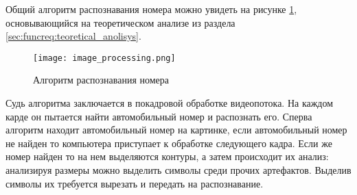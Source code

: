 Общий алгоритм распознавания номера можно увидеть на рисунке \ref{fig:arch:algorythm:image_processing_alg}, основывающийся на теоретическом анализе из раздела \ref{sec:funcreq:teoretical_anolisys}.
\begin{figure}[ht] 
    \centering
    \texttt{[image: image\_processing.png]}  
    \caption{Алгоритм распознавания номера}
    \label{fig:arch:algorythm:image_processing_alg}
\end{figure}
Судь алгоритма заключается в покадровой обработке видеопотока. На каждом карде он пытается найти автомобильный номер и распознать его. 
Сперва алгоритм находит автомобильный номер на картинке, если автомобильный номер не найден то компьютера приступает к обработке следующего кадра. Если же номер найден то на нем выделяются контуры, а затем происходит их анализ: анализируя размеры можно выделить символы среди прочих артефактов. Выделив символы их требуется вырезать и передать на распознавание. 
